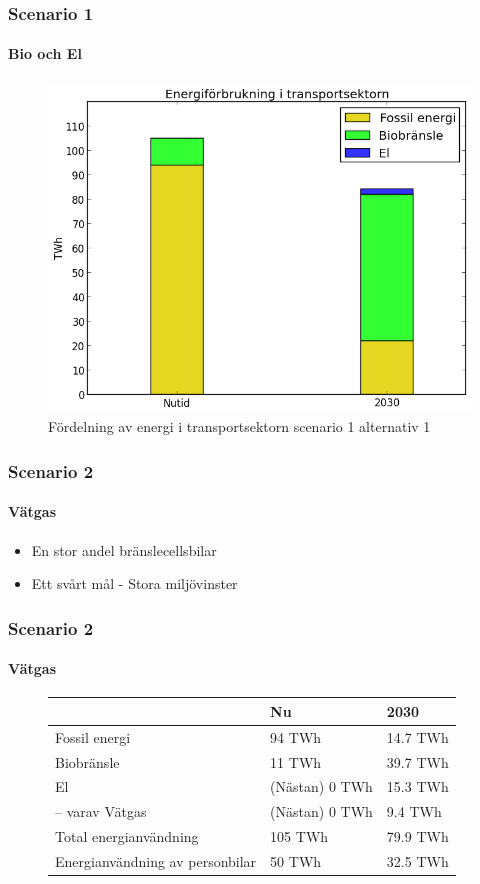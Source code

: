 \documentclass{beamer}
\begin{document}
\begin{frame}
	\frametitle{Scenario 1}
	\framesubtitle{Bio och El}
	\begin{figure}[h!]
       \centering
       \includegraphics[scale=0.5]{scen1a1transport.png}
       \caption{Fördelning av energi i transportsektorn scenario 1 alternativ 1}
	\end{figure}
\end{frame}

\begin{frame}
	\frametitle{Scenario 2}
	\framesubtitle{Vätgas}
	\begin{itemize}
		\item En stor andel bränslecellsbilar
		\item Ett svårt mål - Stora miljövinster
	\end{itemize}
\end{frame}

\begin{frame}
	\frametitle{Scenario 2}
	\framesubtitle{Vätgas}
		\begin{figure}[h!]
			\centering
			\label{tab:scen2energi}
			\begin{tabular}{ | l | l | l | }
			\hline
								& Nu		& 2030 \\ \hline
			Fossil energi				& 94 TWh	& 14.7 TWh \\ \hline
			Biobränsle				& 11 TWh	& 39.7 TWh \\ \hline %
			El					& (Nästan) 0 TWh &  15.3 TWh \\ \hline %
			-- varav Vätgas     & (Nästan) 0 TWh & 9.4 TWh\\ \hline
			Total energianvändning		& 105 TWh	& 79.9 TWh \\ \hline
			Energianvändning av personbilar	& 50 TWh	& 32.5 TWh \\ \hline
			\end{tabular}
		\end{figure}
\end{frame}
\end{document}
